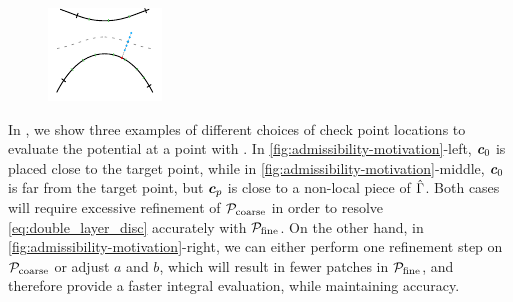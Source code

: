 \begin{figure}[!htb]
\begin{minipage}{.33\textwidth}
    \includegraphics[width=\linewidth]{figs/admissibility_motivation3.pdf}
  \end{minipage}\hfill
\end{figure}
In , we show three examples of different choices of check point locations to evaluate the potential at a point with \qbkix. 
In \cref{fig:admissibility-motivation}-left, ${\bm{c}}_0$ is placed close to the target point, while in \cref{fig:admissibility-motivation}-middle, ${\bm{c}}_0$ is far from the target point, but ${\bm{c}}_p$ is close to a non-local piece of $\hat{\Gamma}$. 
Both cases will require excessive refinement of ${\mathcal{P}_{\mathrm{coarse}}}$ in order to resolve \cref{eq:double_layer_disc} accurately with ${\mathcal{P}_{\mathrm{fine}}}$.
On the other hand, in \cref{fig:admissibility-motivation}-right, we can either perform one refinement step on ${\mathcal{P}_{\mathrm{coarse}}}$ or adjust $a$ and $b$, which will result in fewer patches in ${\mathcal{P}_{\mathrm{fine}}}$, and therefore provide a faster integral evaluation, while maintaining accuracy.

